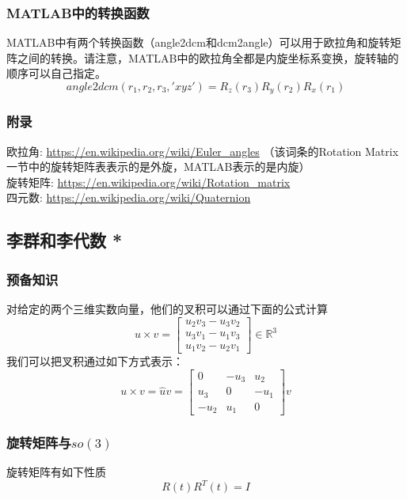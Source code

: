 \subsubsection{MATLAB中的转换函数}
MATLAB中有两个转换函数（angle2dcm和dcm2angle）可以用于欧拉角和旋转矩阵之间的转换。请注意，MATLAB中的欧拉角全都是内旋坐标系变换，旋转轴的顺序可以自己指定。
\\\indent
\begin{equation}
  angle2dcm(r_1,r_2,r_3,'xyz')=R_z(r_3) R_y(r_2) R_x(r_1)
\end{equation}

\subsubsection{附录}
欧拉角: \url{https://en.wikipedia.org/wiki/Euler_angles}
（该词条的Rotation Matrix一节中的旋转矩阵表表示的是外旋，MATLAB表示的是内旋）
\\\indent
旋转矩阵: \url{https://en.wikipedia.org/wiki/Rotation_matrix}
\\\indent
四元数: \url{https://en.wikipedia.org/wiki/Quaternion}


\subsection{李群和李代数 *}
\subsubsection{预备知识}
对给定的两个三维实数向量，他们的叉积可以通过下面的公式计算
\begin{equation}
  u \times v =
  \begin{bmatrix}
    u_2 v_3 - u_3 v_2 \\
    u_3 v_1 - u_1 v_3 \\
    u_1 v_2 - u_2 v_1
  \end{bmatrix}
  \in \mathbb{R}^3
\end{equation}
我们可以把叉积通过如下方式表示：
\begin{equation}
  u \times v =
  \hat{u} v =
  \begin{bmatrix}
    0    & -u_3 & u_2  \\
    u_3  & 0    & -u_1 \\
    -u_2 & u_1  & 0
  \end{bmatrix}
  v
\end{equation}
\subsubsection{旋转矩阵与$so(3)$}
旋转矩阵有如下性质
\begin{equation}
  R(t) R^T(t) = I
\end{equation}

